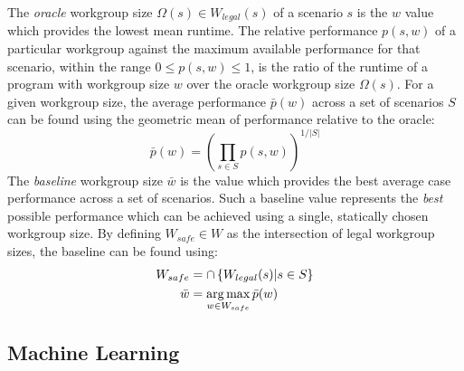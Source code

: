 \documentclass[nonatbib,preprint,9pt]{sigplanconf}
\begin{document}



The \emph{oracle} workgroup size $\Omega(s) \in W_{legal}(s)$ of a
scenario $s$ is the $w$ value which provides the lowest mean
runtime. The relative performance $p(s,w)$ of a particular workgroup
against the maximum available performance for that scenario, within
the range $0 \le p(s,w) \le 1$, is the ratio of the runtime of a
program with workgroup size $w$ over the oracle workgroup size
$\Omega(s)$. For a given workgroup size, the average performance
$\bar{p}(w)$ across a set of scenarios $S$ can be found using the
geometric mean of performance relative to the oracle:
%
\begin{equation}
  \bar{p}(w) =
  \left(
    \prod_{s \in S} p(s, w)
  \right)^{1/|S|}
\end{equation}
%
The \emph{baseline} workgroup size $\bar{w}$ is the value which
provides the best average case performance across a set of
scenarios. Such a baseline value represents the \emph{best} possible
performance which can be achieved using a single, statically chosen
workgroup size. By defining $W_{safe} \in W$ as the intersection of
legal workgroup sizes, the baseline can be found using:
%
\begin{align}
W_{safe} &= \cap \left\{ W_{legal}(s) | s \in S \right\}\\
\bar{w} &= \operatorname*{arg\,max}_{w \in W_{safe}} \bar{p}(w)
\end{align}


\subsection{Machine Learning}
\end{document}
